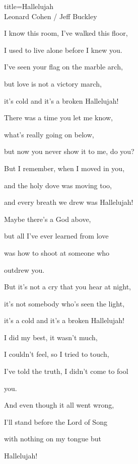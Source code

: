 \begin{song}{title=\predtitle\centering Hallelujah \\\large Leonard Cohen / Jeff Buckley \vspace*{-0.3cm}}
{\begin{centerjustified}
\begin{varwidth}[t]{0.5\textwidth}
	I know this room, I've walked this floor,

	I used to live alone before I knew you.

	I've seen your flag on the marble arch,

	but love is not a victory march,

	it's cold and it's a broken Hallelujah!


\sloka
	There was a time you let me know,

	what's really going on below,

	but now you never show it to me, do you?

	But I remember, when I moved in you,

	and the holy dove was moving too,

	and every breath we drew was Hallelujah!


\sloka
	Maybe there's a God above,
	
	but all I've ever learned from love
	
	was how to shoot at someone who

	outdrew you.

	But it's not a cry that you hear at night,

	it's not somebody who's seen the light,

	it's a cold and it's a broken Hallelujah!

\sloka
	I did my best, it wasn't much,

	I couldn't feel, so I tried to touch,

	I've told the truth, I didn't come to fool

	you.

	And even though it all went wrong,

	I'll stand before the Lord of Song

	with nothing on my tongue but

	Hallelujah!


\end{varwidth}   %

\end{centerjustified}
}
\setcounter{Slokočet}{0}
\end{song}
